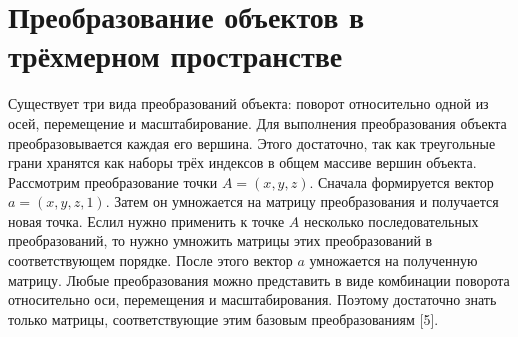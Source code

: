 \section{Преобразование объектов в трёхмерном пространстве} {
    Существует три вида преобразований объекта:
    поворот относительно одной из осей,
    перемещение и масштабирование.
    Для выполнения преобразования объекта преобразовывается
    каждая его вершина.
    Этого достаточно, так как треугольные грани хранятся
    как наборы трёх индексов в общем массиве вершин объекта.
    Рассмотрим преобразование точки $A = (x, y, z)$.
    Сначала формируется вектор $a = (x, y, z, 1)$.
    Затем он умножается на матрицу преобразования и получается новая точка.
    Еслил нужно применить к точке $A$ несколько последовательных преобразований,
    то нужно умножить матрицы этих преобразований в соответствующем порядке.
    После этого вектор $a$ умножается на полученную матрицу.
    Любые преобразования можно представить в виде комбинации поворота относительно оси,
    перемещения и масштабирования.
    Поэтому достаточно знать только матрицы, соответствующие этим
    базовым преобразованиям [5].
}

